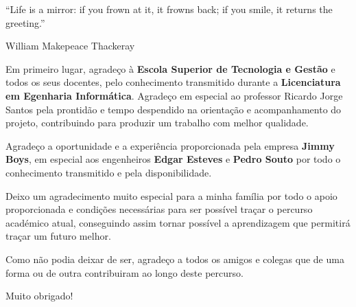 
\begin{flushright}
	\begin{quotebox50}
		``Life is a mirror: if you frown at it, it frowns back; if you smile, it returns the greeting.''

		\tcblower

		William Makepeace Thackeray
	\end{quotebox50}
\end{flushright}

Em primeiro lugar, agradeço à \textbf{Escola Superior de Tecnologia e Gestão} e todos os seus docentes, pelo conhecimento transmitido durante a \textbf{Licenciatura em Egenharia Informática}. Agradeço em especial ao professor Ricardo Jorge Santos pela prontidão e tempo despendido na orientação e acompanhamento do projeto, contribuindo para produzir um trabalho com melhor qualidade.

Agradeço a oportunidade e a experiência proporcionada pela empresa \textbf{Jimmy Boys}, em especial aos engenheiros \textbf{Edgar Esteves} e \textbf{Pedro Souto} por todo o conhecimento transmitido e pela disponibilidade.

Deixo um agradecimento muito especial para a minha família por todo o apoio proporcionada e condições necessárias para ser possível traçar o percurso académico atual, conseguindo assim tornar possível a aprendizagem que permitirá traçar um futuro melhor.

Como não podia deixar de ser, agradeço a todos os amigos e colegas que de uma forma ou de outra contribuiram ao longo deste percurso.

Muito obrigado!

\newpage